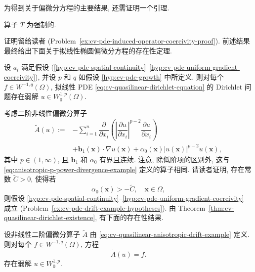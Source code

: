 为得到关于偏微分方程的主要结果, 还需证明一个引理.

\begin{Lemma}
\label{lem:cv-pde-induced-operator-coercivity}
算子 $\overline T$ 为强制的.
\end{Lemma}

证明留给读者 (Problem~\ref{ex:cv-pde-induced-operator-coercivity-proof}). 前述结果最终给出下面关于拟线性椭圆偏微分方程的存在性定理.

\begin{Theorem}
\label{thm:cv-quasilinear-dirichlet-existence}
设 $a_i$ 满足假设 (\ref{hyp:cv-pde-spatial-continuity}--\ref{hyp:cv-pde-uniform-gradient-coercivity}), 并设 $p$ 和 $q$ 如假设 \ref{hyp:cv-pde-growth} 中所定义. 则对每个 $f\in W^{-1,q}(\Omega)$, 拟线性 PDE \eqref{eq:cv-quasilinear-dirichlet-equation} 的 Dirichlet 问题存在弱解 $u\in W_0^{1,p}(\Omega)$.
\end{Theorem}

\begin{Example}
\label{ex:cv-quasilinear-anisotropic-drift-operator}
考虑二阶非线性偏微分算子
\begin{equation}\label{eq:cv-quasilinear-anisotropic-drift-example}
\begin{aligned}\widetilde A(u):=&-\sum_{i=1}^n\dfrac{\partial}{\partial x_i}\left(\left|\dfrac{\partial u}{\partial x_i}\right|^{p-2}\dfrac{\partial u}{\partial x_i}\right)\\&+\bm{b}_1(\bm{x})\cdot\nabla u(\bm{x})+\alpha_0(\bm{x})|u(\bm{x})|^{p-2}u(\bm{x}),\end{aligned}
\end{equation}
其中 $p\in(1,\infty)$, 且 $\bm{b}_1$ 和 $\alpha_0$ 有界且连续. 注意, 除低阶项的区别外, 这与 \eqref{eq:anisotropic-p-power-divergence-example} 定义的算子相同. 请读者证明, 存在常数 $\widetilde C>0$, 使得若
\begin{equation}\label{eq:cv-quasilinear-negative-zero-order-coefficient-bound}
\alpha_0(\bm{x})>-\widetilde C,\quad\bm{x}\in\Omega,
\end{equation}
则假设 \ref{hyp:cv-pde-spatial-continuity}--\ref{hyp:cv-pde-uniform-gradient-coercivity} 成立 (Problem~\ref{ex:cv-pde-drift-example-hypotheses}). 由 Theorem~\ref{thm:cv-quasilinear-dirichlet-existence}, 有下面的存在性结果.
\end{Example}

\begin{Theorem}
\label{thm:cv-quasilinear-anisotropic-drift-existence}
设非线性二阶偏微分算子 $\widetilde A$ 由 \eqref{eq:cv-quasilinear-anisotropic-drift-example} 定义. 则对每个 $f\in W^{-1,q}(\Omega)$, 方程
\begin{equation}\label{eq:cv-quasilinear-anisotropic-drift-existence-equation}
\widetilde A(u)=f.
\end{equation}
存在弱解 $u\in W_0^{1,p}$.
\end{Theorem}

